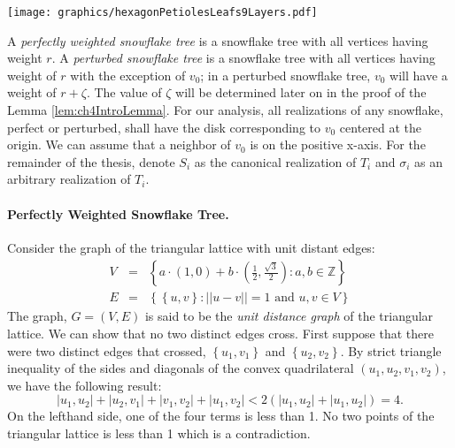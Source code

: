 \documentclass[10pt]{CSUNthesis}
\theoremstyle{plain}%
\theoremstyle{definition}
\theoremstyle{remark}
\newcommand{\bbZ}{{\mathbb{Z}}}
\newcommand{\lr}[1]{\left( #1 \right)}
\newcommand{\vlr}[1]{\left\vert #1 \right\vert}
\begin{document}
\begin{minipage}{\linewidth}
\begin{center}
\texttt{[image: graphics/hexagonPetiolesLeafs9Layers.pdf]}
\label{fig:hexagonPetiolesLeafs9Layers.pdf}
\end{center}
\end{minipage}

A \textit{perfectly weighted snowflake tree} is a snowflake tree with all vertices having weight $r$.   
A \textit{perturbed snowflake tree} is a snowflake tree with all vertices having weight of $r$ with the exception of $v_0$;  in a perturbed snowflake tree, $v_0$ will have a weight of $r + \zeta$.  
The value of $\zeta $ will be determined later on in the proof of the Lemma \ref{lem:ch4IntroLemma}.  
For our analysis, all realizations of any snowflake, perfect or perturbed, shall have the disk corresponding to $v_0$ centered at the origin.  
We can assume that a neighbor of $v_0$ is on the positive x-axis.     
For the remainder of the thesis, denote $S_i$ as the canonical realization of $T_i$ and $\sigma_i$ as an arbitrary realization of $T_i$. 

\paragraph{Perfectly Weighted Snowflake Tree.}

Consider the graph of the triangular lattice with unit distant edges:
\begin{eqnarray*}
V &=& \left\lbrace a \cdot (1,0) + b \cdot \left(\frac{1}{2},\frac{\sqrt{3}}{2}\right) : a,b \in \bbZ \right\rbrace\\
E &=& \left\lbrace \left\lbrace u,v \right\rbrace : \vert\vert u-v \vert\vert = 1 \text{ and } u,v \in V\right\rbrace
\end{eqnarray*}
The graph, $G=(V,E)$ is said to be the \textit{unit distance graph} of the triangular lattice.  
We can show that no two distinct edges cross.  
First suppose that there were two distinct edges that crossed, $\left\lbrace u_1,v_1 \right\rbrace $ and $\left\lbrace u_2,v_2 \right\rbrace$. 
By strict triangle inequality of the sides and diagonals of the convex quadrilateral $\lr{u_1, u_2, v_1, v_2}$, we have the following result:
$$\vlr{u_1,u_2} + \vlr{u_2,v_1} + \vlr{v_1,v_2} + \vlr{u_1,v_2} < 2 \lr{\vlr{u_1,u_2} + \vlr{u_1,u_2 }}=4.$$ 
On the lefthand side, one of the four terms is less than 1.  
No two points of the triangular lattice is less than 1 which is a contradiction.
\end{document}

